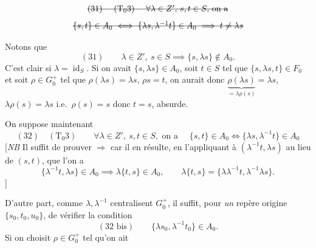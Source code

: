 \documentclass[11pt,a4paper]{article}
\begin{document}
\[
\text{\struck{(31) \quad ($\text{T}_0 3$) \quad $\forall \lambda \in Z'$, $s, t \in S$, on a}}
\]
\[
\text{\struck{$\{s, t\} \in A_0 \iff \{\lambda s, \lambda^{-1} t\} \in A_0 \implies t \neq \lambda s$}}
\]

Notons que
\[
(31) \qquad \lambda \in Z', \ s \in S \implies \{s, \lambda s\} \notin A_0 .
\]
C'est clair si $\lambda = \operatorname{id}_S$. Si on avait $\{s, \lambda s\} \in A_0$, soit $t \in S$ tel que $\{s, \lambda s, t\} \in F_0$ et soit $\rho \in G_0^{+}$ tel que $\rho(\lambda s) = \lambda s$, $\rho s = t$, on aurait donc $\underbrace{\rho(\lambda s)}_{= \lambda \rho(s)} = \lambda s$, \struck{\ill{}} $\lambda \rho(s) = \lambda s$ i.e.\ $\rho(s) = s$ donc $t = s$, absurde.


On suppose maintenant
\[
(32) \quad (\text{T}_0 3) \qquad \forall \lambda \in Z', \ s, t \in S, \text{ on a } \quad
\{s, t\} \in A_0 \iff \{\lambda s, \lambda^{-1} t\} \in A_0
\]
[\emph{NB} Il suffit de prouver  $\Longrightarrow$ car il en résulte, en l'appliquant à $(\lambda^{-1} t, \lambda s)$ au lieu de $(s, t)$, que l'on a
\[
\{\lambda^{-1} t, \lambda s\} \in A_0 \implies \lambda\{t, s\} \in A_0, \qquad \lambda\{t, s\} = \{\lambda \lambda^{-1} t, \lambda^{-1} \lambda s\} .
\]
]

D'autre part, comme $\lambda, \lambda^{-1}$ centralisent $G_0^{+}$, il suffit, pour \emph{un} repère origine $\{s_0, t_0, u_0\}$, de vérifier la condition
\[
(32\text{ bis}) \qquad \{\lambda s_0, \lambda^{-1} t_0\} \in A_0 .
\]
Si on  choisit $\rho \in G_0^{+}$ tel qu'on ait
\end{document}
